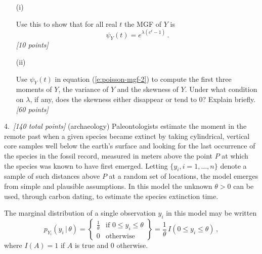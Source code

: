 \documentclass[12pt]{article}
\newcommand{\given}{\, | \,}
\begin{document}
\begin{itemize}
\begin{itemize}

\item[(i)]

Use this to show that for all real $t$ the MGF of $Y$ is
\begin{equation} \label{e:poisson-mgf-2}
\psi_Y ( t ) = e^{ \lambda \left( e^t - 1 \right) } \, .
\end{equation}
\textit{[10 points]}

\item[(ii)]

Use $\psi_Y ( t )$ in equation (\ref{e:poisson-mgf-2}) to compute the first three moments of $Y$, the variance of $Y$ and the skewness of $Y$. Under what condition on $\lambda$, if any, does the skewness either disappear or tend to 0? Explain briefly. \textit{[60 points]}

\end{itemize}

\end{itemize}

4.~\textit{[140 total points]} (archaeology) Paleontologists estimate the moment in the remote past when a given species became extinct by taking cylindrical, vertical core samples well below the earth's surface and looking for the last occurrence of the species in the fossil record, measured in meters above the point $P$ at which the species was known to have first emerged. Letting $\{ y_i, i = 1, \ldots, n \}$ denote \vspace*{0.5ex} a sample of such distances above $P$ at a random set of locations, the model \vspace*{0.5ex} 
emerges from simple and plausible assumptions. In this model the unknown
$\theta > 0$ can be used, through carbon dating, to estimate the species
extinction time.

The marginal distribution of a single observation $y_i$ in this model may be written
\begin{equation} \label{uniform-1}
p_{ Y_i } ( y_i \given \theta ) = \left\{ \begin{array}{cc} \frac{ 1 }{ \theta } & \mbox{if } 0 \le y_i \le \theta \\ 0 & \mbox{otherwise} \end{array}
\right\} = \frac{ 1 }{ \theta } \, I \left( 0 \le y_i \le \theta \right) \, , 
\end{equation}
where $I ( A ) = 1$ if $A$ is true and 0 otherwise. 
\end{document}
